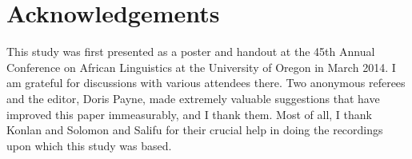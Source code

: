 \documentclass[output=paper]{langsci/langscibook}
\begin{document}
\begin{table}
\caption{‘S/he has fetched fire'  \emph{ʊ̀ chɔ̀gɪ̀sɪ̀wó \textsuperscript{!}bólíŋ}  (Salifu)}

\end{table}





\section*{Acknowledgements}
This study was first presented as a poster and handout at the 45th Annual Conference on African Linguistics at the University of Oregon in March 2014. I am grateful for discussions with various attendees there. Two anonymous referees and the editor, Doris Payne, made extremely valuable suggestions that have improved this paper immeasurably, and I thank them. Most of all, I thank Konlan and Solomon and Salifu for their crucial help in doing the recordings upon which this study was based.


\printbibliography[heading=subbibliography,notkeyword=this]


\renewcommand\thetable{\arabic{table}}  
\end{document}
